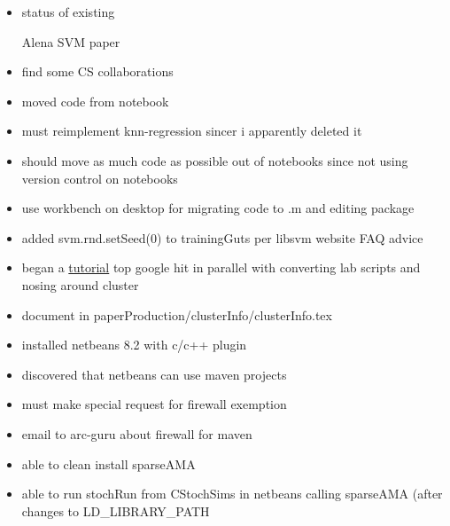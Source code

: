 \documentclass[hyperref]{labbook}
\begin{document}
\begin{itemize}
\item status of existing
  \begin{description}
  \item[Alena SVM paper] 
  \end{description}
\item find some CS collaborations
\end{itemize}



\begin{itemize}
\item moved code from notebook
\end{itemize}


\begin{itemize}
\item must reimplement knn-regression  sincer i apparently deleted it
\item should move as much code as possible out of notebooks since not using version control on notebooks
\item use workbench on desktop for migrating code to .m and editing package
\end{itemize}

\begin{itemize}
\item added svm.rnd.setSeed(0) to trainingGuts per libsvm website FAQ advice
\end{itemize}

\begin{itemize}
\item began a \href{http://www.ceci-hpc.be/slurm_tutorial.html}{tutorial} top google hit in parallel with converting lab scripts and nosing around cluster
\item document in paperProduction/clusterInfo/clusterInfo.tex

\end{itemize}

\begin{itemize}
\item installed netbeans 8.2 with c/c++ plugin
\item discovered that netbeans can use maven projects
\item must make special request for firewall exemption
\item email to arc-guru about firewall for maven
\item able to clean install sparseAMA
\item able to run stochRun from CStochSims in netbeans calling sparseAMA (after changes to LD\_LIBRARY\_PATH
\end{itemize}
\end{document}
